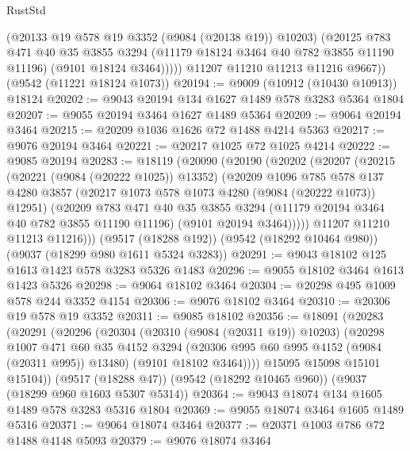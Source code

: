 \begin{lexlean}{RustStd}
\begin{coremodule}
              (@20133 @19 @578 @19 @3352 (@9084 (@20138 @19)) @10203)
              (@20125
                @783
                @471
                @40
                @35
                @3855
                @3294
                (@11179 @18124 @3464 @40 @782 @3855 @11190 @11196)
                (@9101 @18124 @3464)))))
        @11207
        @11210
        @11213
        @11216
        @9667))
    (@9542 (@11221 @18124 @1073))
@20194 := @9009 (@10912 (@10430 @10913)) @18124
@20202 := @9043 @20194 @134 @1627 @1489 @578 @3283 @5364 @1804
@20207 := @9055 @20194 @3464 @1627 @1489 @5364
@20209 := @9064 @20194 @3464
@20215 := @20209 @1036 @1626 @72 @1488 @4214 @5363
@20217 := @9076 @20194 @3464
@20221 := @20217 @1025 @72 @1025 @4214
@20222 := @9085 @20194
@20283 := @18119
    (@20090
      (@20190
        (@20202
          (@20207
            (@20215
              (@20221 (@9084 (@20222 @1025)) @13352)
              (@20209
                @1096
                @785
                @578
                @137
                @4280
                @3857
                (@20217 @1073 @578 @1073 @4280 (@9084 (@20222 @1073)) @12951)
                (@20209
                  @783
                  @471
                  @40
                  @35
                  @3855
                  @3294
                  (@11179 @20194 @3464 @40 @782 @3855 @11190 @11196)
                  (@9101 @20194 @3464)))))
          @11207
          @11210
          @11213
          @11216)))
    (@9517 (@18288 @192))
    (@9542 (@18292 @10464 @980))
    (@9037 (@18299 @980 @1611 @5324 @3283))
@20291 := @9043 @18102 @125 @1613 @1423 @578 @3283 @5326 @1483
@20296 := @9055 @18102 @3464 @1613 @1423 @5326
@20298 := @9064 @18102 @3464
@20304 := @20298 @495 @1009 @578 @244 @3352 @4154
@20306 := @9076 @18102 @3464
@20310 := @20306 @19 @578 @19 @3352
@20311 := @9085 @18102
@20356 := @18091
    (@20283
      (@20291
        (@20296
          (@20304
            (@20310 (@9084 (@20311 @19)) @10203)
            (@20298
              @1007
              @471
              @60
              @35
              @4152
              @3294
              (@20306 @995 @60 @995 @4152 (@9084 (@20311 @995)) @13480)
              (@9101 @18102 @3464))))
        @15095
        @15098
        @15101
        @15104))
    (@9517 (@18288 @47))
    (@9542 (@18292 @10465 @960))
    (@9037 (@18299 @960 @1603 @5307 @5314))
@20364 := @9043 @18074 @134 @1605 @1489 @578 @3283 @5316 @1804
@20369 := @9055 @18074 @3464 @1605 @1489 @5316
@20371 := @9064 @18074 @3464
@20377 := @20371 @1003 @786 @72 @1488 @4148 @5093
@20379 := @9076 @18074 @3464

\end{coremodule}
\end{lexlean}
